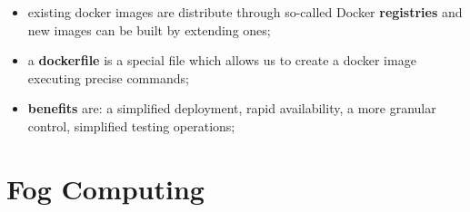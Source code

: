 \documentclass[oneside]{article}
\begin{document}
\begin{itemize}
    \item existing docker images are distribute through so-called Docker \textbf{registries} and new images can be built by extending ones;
    
    \item a \textbf{dockerfile} is a special file which allows us to create a docker image executing precise commands;
    
    \item \textbf{benefits} are: a simplified deployment, rapid availability, a more granular control, simplified testing operations;
\end{itemize}




\newpage
\section{Fog Computing}
\begin{figure}[!htb]
\end{figure}
\end{document}
